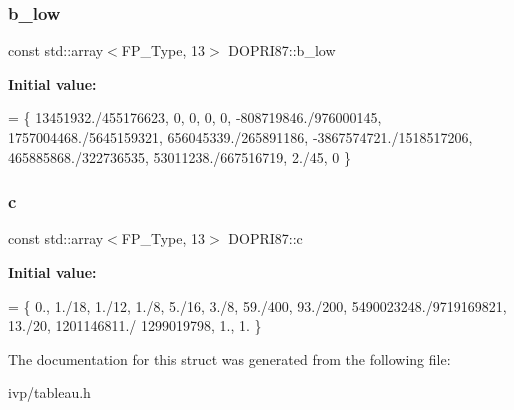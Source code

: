 \subsubsection{\texorpdfstring{b\+\_\+low}{b\_low}}
{\footnotesize\ttfamily const std\+::array$<$F\+P\+\_\+\+Type, 13$>$ D\+O\+P\+R\+I87\+::b\+\_\+low}

{\bfseries Initial value\+:}
\begin{DoxyCode}
= \{
     13451932./455176623, 0, 0, 0, 0, -808719846./976000145, 1757004468./5645159321, 656045339./265891186, 
        -3867574721./1518517206,   465885868./322736535,  53011238./667516719, 2./45, 0
   \}
\end{DoxyCode}
\mbox{\label{structDOPRI87_a4920ff4638ecba0061800d7c456d920d}} 
\subsubsection{\texorpdfstring{c}{c}}
{\footnotesize\ttfamily const std\+::array$<$F\+P\+\_\+\+Type, 13$>$ D\+O\+P\+R\+I87\+::c}

{\bfseries Initial value\+:}
\begin{DoxyCode}
=  \{
    0., 1./18, 1./12, 1./8, 5./16, 3./8, 59./400, 93./200, 5490023248./9719169821, 13./20, 1201146811./
      1299019798, 1., 1.
  \}
\end{DoxyCode}


The documentation for this struct was generated from the following file\+:\begin{DoxyCompactItemize}
\item 
ivp/tableau.\+h\end{DoxyCompactItemize}
